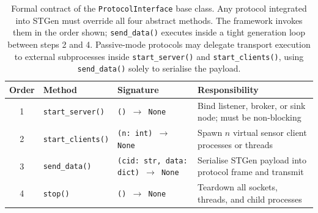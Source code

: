 \documentclass[jsan,article,submit,moreauthors,pdftex]{Definitions/mdpi}
\begin{document}
\begin{table}[H]
\centering
\caption{Formal contract of the \texttt{ProtocolInterface} base class. Any protocol integrated into STGen must override all four abstract methods. The framework invokes them in the order shown; \texttt{send\_data()} executes inside a tight generation loop between steps 2 and 4. Passive-mode protocols may delegate transport execution to external subprocesses inside \texttt{start\_server()} and \texttt{start\_clients()}, using \texttt{send\_data()} solely to serialise the payload.}
\label{tab:protocol-interface}
\small
\begin{tabularx}{\textwidth}{c l l >{\raggedright\arraybackslash}X}
\hline
\textbf{Order} & \textbf{Method} & \textbf{Signature} & \textbf{Responsibility} \\
\hline
1 & \texttt{start\_server()} & \texttt{() $\to$ None} & Bind listener, broker, or sink node; must be non-blocking \\
2 & \texttt{start\_clients()} & \texttt{(n: int) $\to$ None} & Spawn $n$ virtual sensor client processes or threads \\
3 & \texttt{send\_data()} & \texttt{(cid: str, data: dict) $\to$ None} & Serialise STGen payload into protocol frame and transmit \\
4 & \texttt{stop()} & \texttt{() $\to$ None} & Teardown all sockets, threads, and child processes \\
\hline
\end{tabularx}
\end{table}
\end{document}
